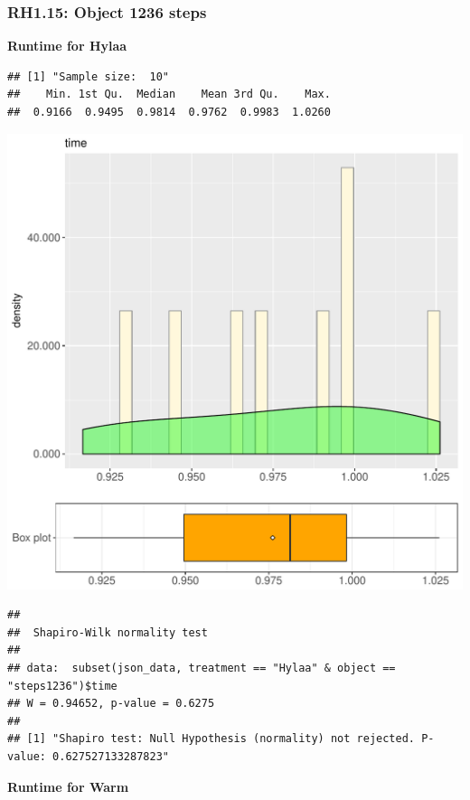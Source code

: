 \documentclass{article}\usepackage[]{graphicx}\usepackage[]{color}
\makeatletter
\def\maxwidth{ %
  \ifdim\Gin@nat@width>\linewidth
    \linewidth
  \else
    \Gin@nat@width
  \fi
}
\newenvironment{kframe}{%
 \def\at@end@of@kframe{}%
 \ifinner\ifhmode%
  \def\at@end@of@kframe{\end{minipage}}%
  \begin{minipage}{\columnwidth}%
 \fi\fi%
 \def\FrameCommand##1{\hskip\@totalleftmargin \hskip-\fboxsep
 \colorbox{shadecolor}{##1}\hskip-\fboxsep
     \hskip-\linewidth \hskip-\@totalleftmargin \hskip\columnwidth}%
 \MakeFramed {\advance\hsize-\width
   \@totalleftmargin\z@ \linewidth\hsize
   \@setminipage}}%
 {\par\unskip\endMakeFramed%
 \at@end@of@kframe}
\newenvironment{knitrout}{}{} %
\makeatother
\begin{document}
\subsubsection{RH1.15: Object 1236 steps}

 \textbf{Runtime for Hylaa}
\begin{knitrout}
\color{fgcolor}\begin{kframe}
\begin{verbatim}
## [1] "Sample size:  10"
##    Min. 1st Qu.  Median    Mean 3rd Qu.    Max. 
##  0.9166  0.9495  0.9814  0.9762  0.9983  1.0260
\end{verbatim}
\end{kframe}
\includegraphics[width=\maxwidth]{figure/RH1_Hylaa_steps1236-1} 
\begin{kframe}\begin{verbatim}
## 
## 	Shapiro-Wilk normality test
## 
## data:  subset(json_data, treatment == "Hylaa" & object == "steps1236")$time
## W = 0.94652, p-value = 0.6275
## 
## [1] "Shapiro test: Null Hypothesis (normality) not rejected. P-value: 0.627527133287823"
\end{verbatim}
\end{kframe}
\end{knitrout}
 \textbf{Runtime for Warm}
\end{document}
